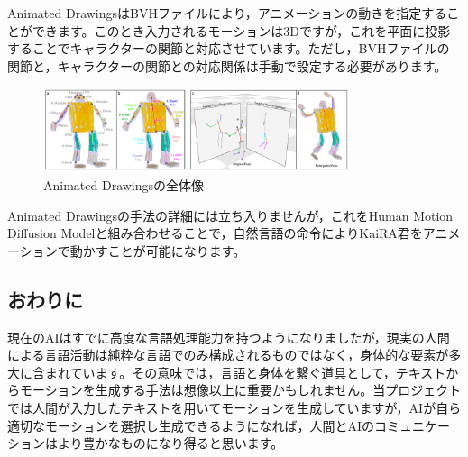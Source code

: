 Animated DrawingsはBVHファイルにより，アニメーションの動きを指定することができます。このとき入力されるモーションは3Dですが，これを平面に投影することでキャラクターの関節と対応させています。ただし，BVHファイルの関節と，キャラクターの関節との対応関係は手動で設定する必要があります。

\begin{figure}[htbp]
    \centering
    \includegraphics[width=0.8\textwidth]{moving-kaira-kun/fig/animated_drawings.png}
    \caption{Animated Drawingsの全体像}
    \label{fig:animated_drawings}
\end{figure}

Animated Drawingsの手法の詳細には立ち入りませんが，これをHuman Motion Diffusion Modelと組み合わせることで，自然言語の命令によりKaiRA君をアニメーションで動かすことが可能になります。

\subsection{おわりに}

現在のAIはすでに高度な言語処理能力を持つようになりましたが，現実の人間による言語活動は純粋な言語でのみ構成されるものではなく，身体的な要素が多大に含まれています。その意味では，言語と身体を繋ぐ道具として，テキストからモーションを生成する手法は想像以上に重要かもしれません。当プロジェクトでは人間が入力したテキストを用いてモーションを生成していますが，AIが自ら適切なモーションを選択し生成できるようになれば，人間とAIのコミュニケーションはより豊かなものになり得ると思います。

%  

% 
